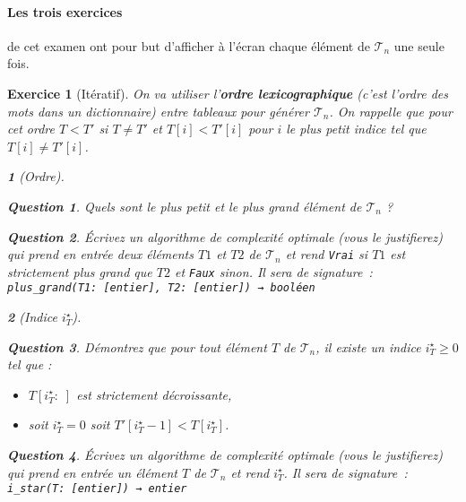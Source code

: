 \documentclass{article}
\theoremstyle{exostyle}
\newtheorem{exo}{Exercice}
\theoremstyle{partiestyle}
\newtheorem{partie}{}[exo]
\theoremstyle{questionstyle}
\newtheorem{questionpartie}{Question}[partie]
\begin{document}
\paragraph{Les trois exercices} de cet examen ont pour but d'afficher à l'écran chaque élément de $\mathcal{T}_n$ une seule fois. 

\clearpage

\begin{exo}[Itératif]
    On va utiliser l'{\em\bf ordre lexicographique} (c'est l'ordre des mots dans un dictionnaire) entre tableaux pour générer $\mathcal{T}_n$. On rappelle que pour cet ordre $T < T'$ si $T \neq T'$ et $T[i] < T'[i]$ pour $i$ le plus petit indice tel que $T[i] \neq T'[i]$.
    \begin{partie}[Ordre]
        \begin{questionpartie}
            Quels sont le plus petit et le plus grand élément de $\mathcal{T}_n$ ?
        \end{questionpartie}
        \begin{questionpartie}
            Écrivez un algorithme de complexité optimale (vous le justifierez) qui prend en entrée deux éléments $T1$ et $T2$ de $\mathcal{T}_n$ et rend \verb|Vrai| si $T1$ est strictement plus grand que $T2$ et \verb|Faux| sinon. Il sera de signature~:
              \verb|plus_grand(T1: [entier], T2: [entier]) → booléen| 
        \end{questionpartie}
    \end{partie}
    \begin{partie}[Indice $i^\star_{T}$]
        \begin{questionpartie}
            Démontrez que pour tout élément $T$ de $\mathcal{T}_n$, il existe un indice $i^\star_{T}\geq 0$ tel que :
            \begin{itemize}
                \item $T[i^\star_{T}:\;]$ est strictement décroissante,
                \item soit $i^\star_{T}=0$ soit $T'[i^\star_{T}-1] < T[i^\star_{T}]$.
            \end{itemize}
        \end{questionpartie}
        \begin{questionpartie}
            Écrivez un algorithme de complexité optimale (vous le justifierez) qui prend en entrée un élément $T$ de $\mathcal{T}_n$ et rend $i^\star_{T}$. Il sera de signature~:
              \verb|i_star(T: [entier]) → entier| 
        \end{questionpartie}

\end{partie}
\end{exo}
\end{document}

